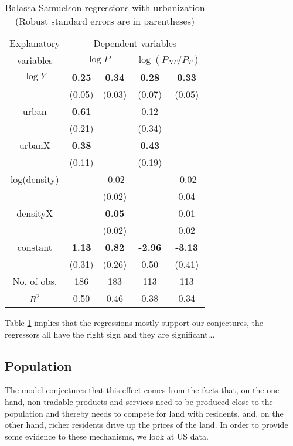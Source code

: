 \documentclass[12pt]{article}
\begin{document}
\begin{table}[h]
\caption{Balassa-Samuelson regressions with urbanization (Robust
standard errors are in parentheses)} \center \label{tab:BS}
\begin{tabular}{c|cc|cc}
  \hline\hline
  Explanatory & \multicolumn{4}{|c}{Dependent variables} \\
  variables &\multicolumn{2}{c}{$\log P$} & \multicolumn{2}{c}{$\log(P_{NT}/P_T)$} \\ \hline
  $\log Y$ & \textbf{0.25} & \textbf{0.34} & \textbf{0.28}   & \textbf{0.33} \\
           & (0.05)        & (0.03)        & (0.07)          & (0.05)        \\
  urban    & \textbf{0.61} &               & 0.12            &               \\
           & (0.21)        &               & (0.34)          &               \\
  urbanX   & \textbf{0.38} &               & \textbf{0.43}   &              \\
           & (0.11)        &               & (0.19)          &              \\
  log(density) &           & -0.02         &                 & -0.02        \\
             &             & (0.02)        &                 &  0.04        \\
  densityX &               & \textbf{0.05} &                  & 0.01         \\
           &               & (0.02)        &                 & 0.02         \\
  constant & \textbf{1.13} & \textbf{0.82} & \textbf{-2.96}  & \textbf{-3.13}\\
           & (0.31)        & (0.26)        & 0.50            & (0.41)        \\ \hline
  No. of obs. & 186        & 183           & 113             & 113          \\
  $R^2$    & 0.50          & 0.46          & 0.38            & 0.34  \\
  \hline\hline
\end{tabular}
\end{table}

Table \ref{tab:BS} implies that the regressions mostly support our
conjectures, the regressors all have the right sign and they are
significant...

\subsection{Population }
The model conjectures that this effect comes from the facts that, on
the one hand, non-tradable products and services need to be produced
close to the population and thereby needs to compete for land with
residents, and, on the other hand, richer residents drive up the
prices of the land. In order to provide some evidence to these
mechanisms, we look at US data.
\end{document}
